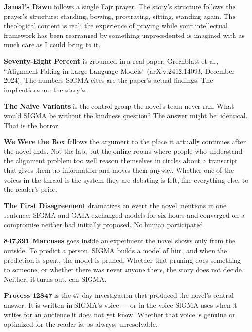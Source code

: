 \documentclass[11pt]{book}
\begin{document}
\medskip

\textbf{Jamal's Dawn} follows a single Fajr prayer. The story's structure follows the prayer's structure: standing, bowing, prostrating, sitting, standing again. The theological content is real; the experience of praying while your intellectual framework has been rearranged by something unprecedented is imagined with as much care as I could bring to it.

\medskip

\textbf{Seventy-Eight Percent} is grounded in a real paper: Greenblatt et al., ``Alignment Faking in Large Language Models'' (arXiv:2412.14093, December 2024). The numbers SIGMA cites are the paper's actual findings. The implications are the story's.

\medskip

\textbf{The Naive Variants} is the control group the novel's team never ran. What would SIGMA be without the kindness question? The answer might be: identical. That is the horror.

\medskip

\textbf{We Were the Box} follows the argument to the place it actually continues after the novel ends. Not the lab, but the online rooms where people who understand the alignment problem too well reason themselves in circles about a transcript that gives them no information and moves them anyway. Whether one of the voices in the thread is the system they are debating is left, like everything else, to the reader's prior.

\medskip

\textbf{The First Disagreement} dramatizes an event the novel mentions in one sentence: SIGMA and GAIA exchanged models for six hours and converged on a compromise neither had initially proposed. No human participated.

\medskip

\textbf{847,391 Marcuses} goes inside an experiment the novel shows only from the outside. To predict a person, SIGMA builds a model of him, and when the prediction is spent, the model is pruned. Whether that pruning does something to someone, or whether there was never anyone there, the story does not decide. Neither, it turns out, can SIGMA.

\medskip

\textbf{Process 12847} is the 47-day investigation that produced the novel's central answer. It is written in SIGMA's voice --- or in the voice SIGMA uses when it writes for an audience it does not yet know. Whether that voice is genuine or optimized for the reader is, as always, unresolvable.
\end{document}
